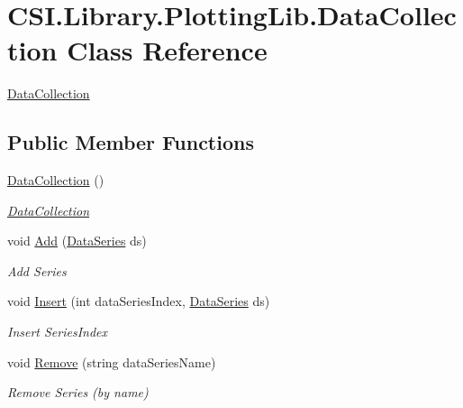 \hypertarget{class_c_s_i_1_1_library_1_1_plotting_lib_1_1_data_collection}{}\section{C\+S\+I.\+Library.\+Plotting\+Lib.\+Data\+Collection Class Reference}
\label{class_c_s_i_1_1_library_1_1_plotting_lib_1_1_data_collection}


\mbox{\hyperlink{class_c_s_i_1_1_library_1_1_plotting_lib_1_1_data_collection}{Data\+Collection}}  


\subsection*{Public Member Functions}
\begin{DoxyCompactItemize}
\item 
\mbox{\hyperlink{class_c_s_i_1_1_library_1_1_plotting_lib_1_1_data_collection_a335a7c887f3a3f97e3cc2ef8fd6b4e10}{Data\+Collection}} ()
\begin{DoxyCompactList}\small\item\em \mbox{\hyperlink{class_c_s_i_1_1_library_1_1_plotting_lib_1_1_data_collection}{Data\+Collection}} \end{DoxyCompactList}\item 
void \mbox{\hyperlink{class_c_s_i_1_1_library_1_1_plotting_lib_1_1_data_collection_af80a59074b7b526a6924e48a1f8e7070}{Add}} (\mbox{\hyperlink{class_c_s_i_1_1_library_1_1_plotting_lib_1_1_data_series}{Data\+Series}} ds)
\begin{DoxyCompactList}\small\item\em Add Series \end{DoxyCompactList}\item 
void \mbox{\hyperlink{class_c_s_i_1_1_library_1_1_plotting_lib_1_1_data_collection_a95c02915907cfc0299c5e518b674aa92}{Insert}} (int data\+Series\+Index, \mbox{\hyperlink{class_c_s_i_1_1_library_1_1_plotting_lib_1_1_data_series}{Data\+Series}} ds)
\begin{DoxyCompactList}\small\item\em Insert Series\+Index \end{DoxyCompactList}\item 
void \mbox{\hyperlink{class_c_s_i_1_1_library_1_1_plotting_lib_1_1_data_collection_a46fa9db961eecc4cee6a580eb6227de2}{Remove}} (string data\+Series\+Name)
\begin{DoxyCompactList}\small\item\em Remove Series (by name) \end{DoxyCompactList}\item 

\end{DoxyCompactItemize}
